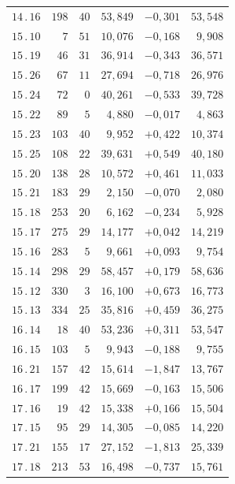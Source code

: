 \begin{center}
\begin{tabular}[t]{|c|r@{\;}r@{\;}r|r|r|}
$14\, .\, 16$ & $198$ & $40$ & $53{,}849$ & $-0{,}301$ & $53{,}548$\\[7pt]
$15\, .\, 10$ & $7$ & $51$ & $10{,}076$ & $-0{,}168$ & $9{,}908$\\
$15\, .\, 19$ & $46$ & $31$ & $36{,}914$ & $-0{,}343$ & $36{,}571$\\
$15\, .\, 26$ & $67$ & $11$ & $27{,}694$ & $-0{,}718$ & $26{,}976$\\
$15\, .\, 24$ & $72$ & $0$ & $40{,}261$ & $-0{,}533$ & $39{,}728$\\
$15\, .\, 22$ & $89$ & $5$ & $4{,}880$ & $-0{,}017$ & $4{,}863$\\
$15\, .\, 23$ & $103$ & $40$ & $9{,}952$ & $+0{,}422$ & $10{,}374$\\
$15\, .\, 25$ & $108$ & $22$ & $39{,}631$ & $+0{,}549$ & $40{,}180$\\
$15\, .\, 20$ & $138$ & $28$ & $10{,}572$ & $+0{,}461$ & $11{,}033$\\
$15\, .\, 21$ & $183$ & $29$ & $2{,}150$ & $-0{,}070$ & $2{,}080$\\
$15\, .\, 18$ & $253$ & $20$ & $6{,}162$ & $-0{,}234$ & $5{,}928$\\
$15\, .\, 17$ & $275$ & $29$ & $14{,}177$ & $+0{,}042$ & $14{,}219$\\
$15\, .\, 16$ & $283$ & $5$ & $9{,}661$ & $+0{,}093$ & $9{,}754$\\
$15\, .\, 14$ & $298$ & $29$ & $58{,}457$ & $+0{,}179$ & $58{,}636$\\
$15\, .\, 12$ & $330$ & $3$ & $16{,}100$ & $+0{,}673$ & $16{,}773$\\
$15\, .\, 13$ & $334$ & $25$ & $35{,}816$ & $+0{,}459$ & $36{,}275$\\[7pt]
$16\, .\, 14$ & $18$ & $40$ & $53{,}236$ & $+0{,}311$ & $53{,}547$\\
$16\, .\, 15$ & $103$ & $5$ & $9{,}943$ & $-0{,}188$ & $9{,}755$\\
$16\, .\, 21$ & $157$ & $42$ & $15{,}614$ & $-1{,}847$ & $13{,}767$\\
$16\, .\, 17$ & $199$ & $42$ & $15{,}669$ & $-0{,}163$ & $15{,}506$\\[7pt]
$17\, .\, 16$ & $19$ & $42$ & $15{,}338$ & $+0{,}166$ & $15{,}504$\\
$17\, .\, 15$ & $95$ & $29$ & $14{,}305$ & $-0{,}085$ & $14{,}220$\\
$17\, .\, 21$ & $155$ & $17$ & $27{,}152$ & $-1{,}813$ & $25{,}339$\\
$17\, .\, 18$ & $213$ & $53$ & $16{,}498$ & $-0{,}737$ & $15{,}761$\\[7pt]

\end{tabular}
\end{center}
